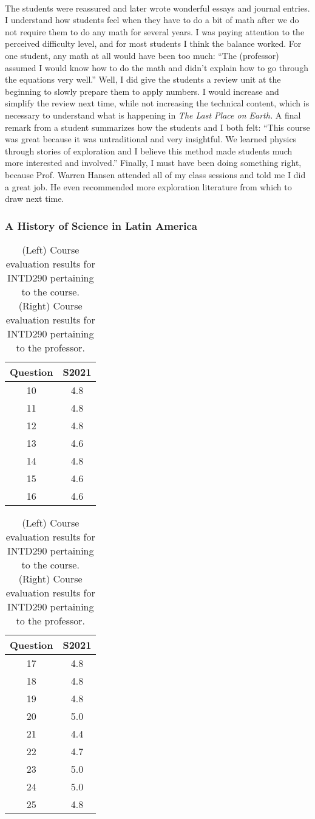 \documentclass[../../../main.tex]{subfiles}
\begin{document}
\\
\vspace{0.25cm}
The students were reassured and later wrote wonderful essays and journal entries.  I understand how students feel when they have to do a bit of math after we do not require them to do any math for several years.  I was paying attention to the perceived difficulty level, and for most students I think the balance worked.  For one student, any math at all would have been too much: ``The (professor) assumed I would know how to do the math and didn't explain how to go through the equations very well.''  Well, I did give the students a review unit at the beginning to slowly prepare them to apply numbers.  I would increase and simplify the review next time, while not increasing the technical content, which is necessary to understand what is happening in \textit{The Last Place on Earth.}  A final remark from a student summarizes how the students and I both felt: ``This course was great because it was untraditional and very insightful.  We learned physics through stories of exploration and I believe this method made students much more interested and involved.''  Finally, I must have been doing something right, because Prof. Warren Hansen attended all of my class sessions and told me I did a great job.  He even recommended more exploration literature from which to draw next time.

\subsubsection{A History of Science in Latin America}

\begin{table}
\footnotesize
\centering
\begin{tabular}{| c | c |}
\hline
\hline
Question & S2021 \\ \hline
10 & 4.8 \\ \hline
11 & 4.8 \\ \hline
12 & 4.8 \\ \hline
13 & 4.6 \\ \hline
14 & 4.8 \\ \hline
15 & 4.6 \\ \hline
16 & 4.6 \\ \hline
\hline
\end{tabular}
\begin{tabular}{| c | c |}
\hline
\hline
Question & S2021 \\ \hline
17 & 4.8 \\ \hline
18 & 4.8 \\ \hline
19 & 4.8 \\ \hline
20 & 5.0 \\ \hline
21 & 4.4 \\ \hline
22 & 4.7 \\ \hline
23 & 5.0 \\ \hline
24 & 5.0 \\ \hline
25 & 4.8 \\ \hline
\hline
\end{tabular}
\caption{\label{tab:eval_290} (Left) Course evaluation results for INTD290 pertaining to the course.  (Right) Course evaluation results for INTD290 pertaining to the professor.}
\end{table}
\end{document}
